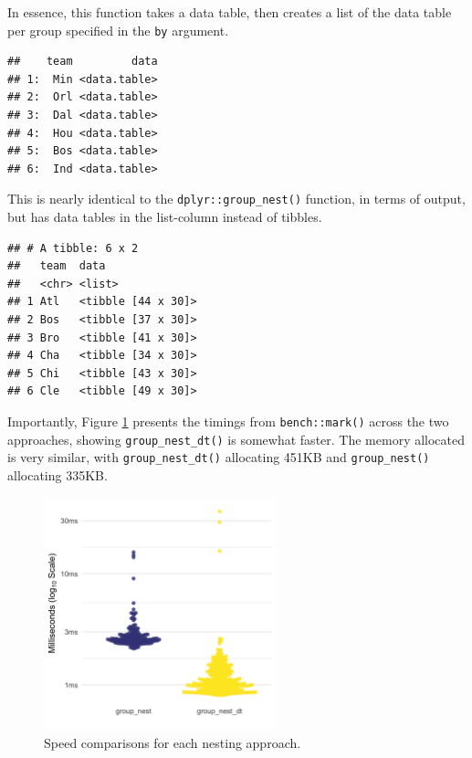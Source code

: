 \documentclass[doc]{apa6}
\newenvironment{Shaded}{\begin{snugshade}}{\end{snugshade}}
\newcommand{\KeywordTok}[1]{\textcolor[rgb]{0.13,0.29,0.53}{\textbf{#1}}}
\newcommand{\NormalTok}[1]{#1}
\newcommand{\OperatorTok}[1]{\textcolor[rgb]{0.81,0.36,0.00}{\textbf{#1}}}
\newcommand{\StringTok}[1]{\textcolor[rgb]{0.31,0.60,0.02}{#1}}
\begin{document}
In essence, this function takes a data table, then creates a list of the data table per group specified in the \texttt{by} argument.

\begin{Shaded}
\end{Shaded}

\begin{verbatim}
##    team         data
## 1:  Min <data.table>
## 2:  Orl <data.table>
## 3:  Dal <data.table>
## 4:  Hou <data.table>
## 5:  Bos <data.table>
## 6:  Ind <data.table>
\end{verbatim}

This is nearly identical to the \texttt{dplyr::group\_nest()} function, in terms of output, but has data tables in the list-column instead of tibbles.

\begin{Shaded}
\end{Shaded}

\begin{verbatim}
## # A tibble: 6 x 2
##   team  data              
##   <chr> <list>            
## 1 Atl   <tibble [44 x 30]>
## 2 Bos   <tibble [37 x 30]>
## 3 Bro   <tibble [41 x 30]>
## 4 Cha   <tibble [34 x 30]>
## 5 Chi   <tibble [43 x 30]>
## 6 Cle   <tibble [49 x 30]>
\end{verbatim}

Importantly, Figure \ref{speed} presents the timings from \texttt{bench::mark()} across the two approaches, showing \texttt{group\_nest\_dt()} is somewhat faster. The memory allocated is very similar, with \texttt{group\_nest\_dt()} allocating 451KB and \texttt{group\_nest()} allocating 335KB.

\begin{figure}[htb]
  \centering
  \includegraphics[width=0.6\textwidth]{timings_manuscript.png}
  \caption{Speed comparisons for each nesting approach.}
  \label{speed}
\end{figure}
\end{document}
